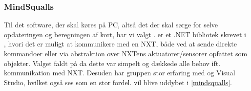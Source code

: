 \subsubsection*{MindSqualls}
Til det software, der skal køres på PC, altså det der skal sørge for selve opdateringen og beregningen af kort, har vi valgt \mindsqualls.
\mindsqualls er et .NET bibliotek skrevet i \csharp, hvori det er muligt at kommunikere med en NXT, både ved at sende direkte kommandoer eller via abstraktion over NXTens aktuatorer/sensorer opfattet som objekter.
Valget faldt på \mindsqualls da dette var simpelt og dækkede alle behov ift. kommunikation med NXT.
Desuden har gruppen stor erfaring med \csharp og Visual Studio, hvilket også ses som en stor fordel.
\mindsqualls vil blive uddybet i \cref{mindsqualls}.
